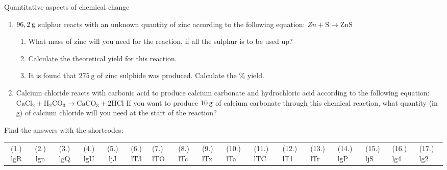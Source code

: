 \begin{eocexercises}{Quantitative aspects of chemical change}
\begin{enumerate}[noitemsep, label=\textbf{\arabic*}. ]
\begin{enumerate}[noitemsep, label=\textbf{\alph*}. ]
\label{m38712*uid158}\item Write down a balanced equation for the reaction which takes place when these two solutions are mixed.
\label{m38712*uid159}\item Calculate the number of moles of $\text{H}{}_{2}\text{SO}{}_{4}$ which were added to the NaOH solution.
\end{enumerate}
                \label{m38717*uid64}\item $96,2\phantom{\rule{2pt}{0ex}}\text{g}$ sulphur reacts with an unknown quantity of zinc according to the following equation:
$Zn+\text{S}\to \text{ZnS}$\label{m38717*id280179}\begin{enumerate}[noitemsep, label=\textbf{\alph*}. ] 
            \label{m38717*uid65}\item What mass of zinc will you need for the reaction, if all the sulphur is to be used up?
\label{m38717*uid66}\item Calculate the theoretical yield for this reaction.
\item It is found that $275~\text{g}$ of zinc sulphide was produced. Calculate the \% yield.
\end{enumerate}
                \label{m38717*uid67}\item Calcium chloride reacts with carbonic acid to produce calcium carbonate and hydrochloric acid according to the following equation:
${\text{CaCl}}_{2}+{\text{H}}_{2}{\text{CO}}_{3}\to {\text{CaCO}}_{3}+2\text{HCl}$
If you want to produce $10\phantom{\rule{2pt}{0ex}}\text{g}$ of calcium carbonate through this chemical reaction, what quantity (in g) of calcium chloride will you need at the start of the reaction?\newline
                \end{enumerate}
  \label{m38712**end}
  \label{0044f0dab6cfd2ca2bac282dc4009886**end}
\par {} Find the answers with the shortcodes:
 \par \begin{tabular}[h]{cccccc}
 (1.) lgR  &  (2.) lgn  &  (3.) lgQ  &  (4.) lgU  &  (5.) ljJ  &  (6.) lT3  &  (7.) lTO  &  (8.) lTc  &  (9.) lTx  &  (10.) lTa  &  (11.) lTC  &  (12.) lT1  &  (13.) lTr  &  (14.) lgP  &  (15.) ljS  & (16.) lg4 & (17.) lg2 \end{tabular}
\end{eocexercises}
